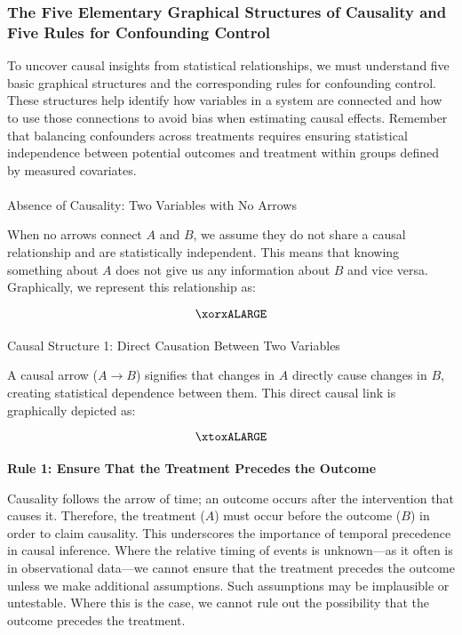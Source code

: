 \documentclass[
  singlecolumn]{article}
\makeatletter
\let\oldparagraph\paragraph
\renewcommand{\paragraph}{
    \@ifstar
      \xxxParagraphStar
      \xxxParagraphNoStar
  }
\newcommand{\xxxParagraphStar}[1]{\oldparagraph*{#1}\mbox{}}
\newcommand{\xxxParagraphNoStar}[1]{\oldparagraph{#1}\mbox{}}
\makeatother
\begin{document}
\subsubsection{The Five Elementary Graphical Structures of Causality and
Five Rules for Confounding Control}\label{sec-five-elementary}

To uncover causal insights from statistical relationships, we must
understand five basic graphical structures and the corresponding rules
for confounding control. These structures help identify how variables in
a system are connected and how to use those connections to avoid bias
when estimating causal effects. Remember that balancing confounders
across treatments requires ensuring statistical independence between
potential outcomes and treatment within groups defined by measured
covariates.

\paragraph{Absence of Causality: Two Variables with No
Arrows}\label{absence-of-causality-two-variables-with-no-arrows}

When no arrows connect \(A\) and \(B\), we assume they do not share a
causal relationship and are statistically independent. This means that
knowing something about \(A\) does not give us any information about
\(B\) and vice versa. Graphically, we represent this relationship as:

\[
\xorxALARGE
\]

\paragraph{Causal Structure 1: Direct Causation Between Two
Variables}\label{causal-structure-1-direct-causation-between-two-variables}

A causal arrow (\(A \to B\)) signifies that changes in \(A\) directly
cause changes in \(B\), creating statistical dependence between them.
This direct causal link is graphically depicted as:

\[
\xtoxALARGE
\]

\paragraph{\texorpdfstring{\textbf{Rule 1: Ensure That the Treatment
Precedes the
Outcome}}{Rule 1: Ensure That the Treatment Precedes the Outcome}}\label{sec-four-rules}

Causality follows the arrow of time; an outcome occurs after the
intervention that causes it. Therefore, the treatment (\(A\)) must occur
before the outcome (\(B\)) in order to claim causality. This underscores
the importance of temporal precedence in causal inference. Where the
relative timing of events is unknown---as it often is in observational
data---we cannot ensure that the treatment precedes the outcome unless
we make additional assumptions. Such assumptions may be implausible or
untestable. Where this is the case, we cannot rule out the possibility
that the outcome precedes the treatment.
\end{document}

